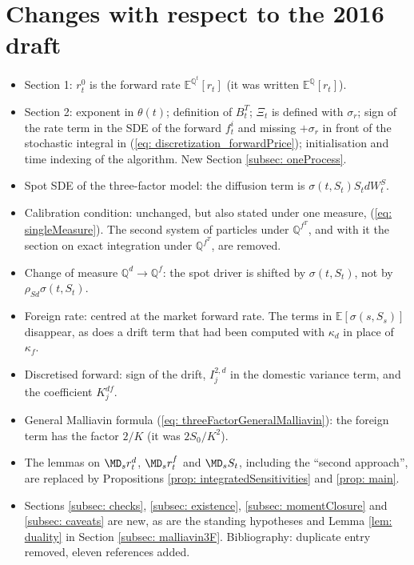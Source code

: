 \section{Changes with respect to the 2016 draft}
\begin{itemize}
\item Section 1: $r^0_t$ is the forward rate $\mathbb{E}^{\mathbb{Q}^t}[r_t]$ (it was written $\mathbb{E}^{\mathbb{Q}}[r_t]$).
\item Section 2: exponent in $\theta(t)$; definition of $B^T_t$; $\Xi_t$ is defined with $\sigma_r$; sign of the rate term in the SDE of the forward $f^i_t$ and missing $+\sigma_r$ in front of the stochastic integral in (\ref{eq: discretization_forwardPrice}); initialisation and time indexing of the algorithm. New Section \ref{subsec: oneProcess}.
\item Spot SDE of the three-factor model: the diffusion term is $\sigma(t,S_t)S_tdW^S_t$.
\item Calibration condition: unchanged, but also stated under one measure, (\ref{eq: singleMeasure}). The second system of particles under $\mathbb{Q}^{f^T}$, and with it the section on exact integration under $\mathbb{Q}^{f^T}$, are removed.
\item Change of measure $\mathbb{Q}^d\to\mathbb{Q}^f$: the spot driver is shifted by $\sigma(t,S_t)$, not by $\rho_{Sd}\sigma(t,S_t)$.
\item Foreign rate: centred at the market forward rate. The terms in $\mathbb{E}[\sigma(s,S_s)]$ disappear, as does a drift term that had been computed with $\kappa_d$ in place of $\kappa_f$.
\item Discretised forward: sign of the drift, $I^{2,d}_j$ in the domestic variance term, and the coefficient $K^{df}_j$.
\item General Malliavin formula (\ref{eq: threeFactorGeneralMalliavin}): the foreign term has the factor $2/K$ (it was $2S_0/K^2$).
\item The lemmas on $\MD_sr^d_t$, $\MD_sr^f_t$ and $\MD_sS_t$, including the ``second approach'', are replaced by Propositions \ref{prop: integratedSensitivities} and \ref{prop: main}.
\item Sections \ref{subsec: checks}, \ref{subsec: existence}, \ref{subsec: momentClosure} and \ref{subsec: caveats} are new, as are the standing hypotheses and Lemma \ref{lem: duality} in Section \ref{subsec: malliavin3F}. Bibliography: duplicate entry removed, eleven references added.
\end{itemize}
